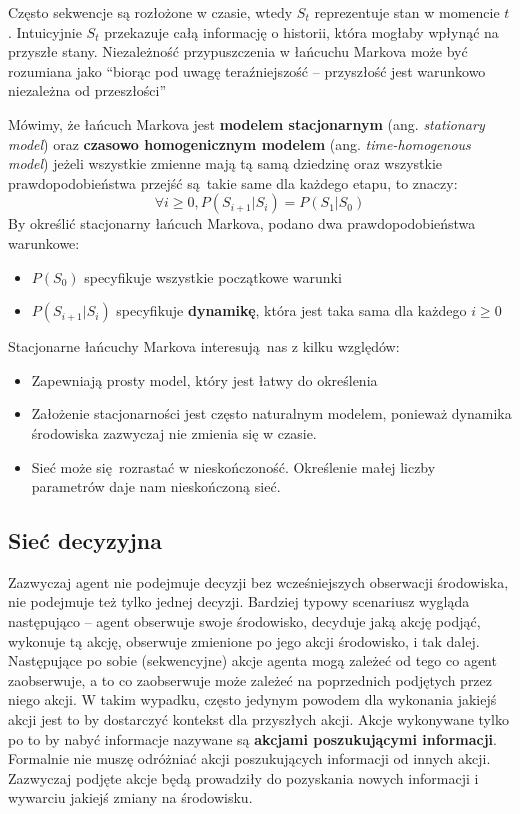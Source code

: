 \documentclass[a4paper, 12pt,oneside]{book}
\begin{document}
Często sekwencje są rozłożone w czasie, wtedy $S_t$ reprezentuje stan w
momencie $t$. Intuicyjnie $S_t$ przekazuje całą informację o historii, która
mogłaby wpłynąć na przyszłe stany. Niezależność przypuszczenia w łańcuchu
Markova może być rozumiana jako ``biorąc pod uwagę teraźniejszość -- przyszłość
jest warunkowo niezależna od przeszłości''

Mówimy, że łańcuch Markova jest \textbf{modelem stacjonarnym} (ang.
\textit{stationary model}) oraz \textbf{czasowo homogenicznym modelem} (ang.
\textit{time-homogenous model}) jeżeli wszystkie zmienne mają tą samą dziedzinę
oraz wszystkie prawdopodobieństwa przejść są takie same dla każdego etapu, to
znaczy:
\[\forall i \ge 0, P(S_{i+1}|S_i) = P(S_1|S_0)\]
By określić stacjonarny łańcuch Markova, podano dwa prawdopodobieństwa
warunkowe:
\begin{itemize}
		\setlength\itemsep{-0.4em}
	\item $P(S_0)$ specyfikuje wszystkie początkowe warunki
	\item $P(S_{i+1} | S_i)$ specyfikuje \textbf{dynamikę}, która jest taka
		sama dla każdego $i \ge 0$
\end{itemize}
Stacjonarne łańcuchy Markova interesują nas z kilku względów:
\begin{itemize}
		\setlength\itemsep{-0.4em}
	\item Zapewniają prosty model, który jest łatwy do określenia
	\item Założenie stacjonarności jest często naturalnym modelem, ponieważ
		dynamika środowiska zazwyczaj nie zmienia się w czasie.
	\item Sieć może się rozrastać w nieskończoność. Określenie małej liczby
		parametrów daje nam nieskończoną
		sieć\cite{ai_foundations_markov_chains}.
\end{itemize}

\subsection{Sieć decyzyjna}
Zazwyczaj agent nie podejmuje decyzji bez wcześniejszych obserwacji środowiska,
nie podejmuje też tylko jednej decyzji. Bardziej typowy scenariusz wygląda
następująco -- agent obserwuje swoje środowisko, decyduje jaką akcję podjąć,
wykonuje tą akcję, obserwuje zmienione po jego akcji środowisko, i tak dalej.
Następujące po sobie (sekwencyjne) akcje agenta mogą zależeć od tego co agent
zaobserwuje, a to co zaobserwuje może zależeć na poprzednich podjętych przez
niego akcji. W takim wypadku, często jedynym powodem dla wykonania jakiejś
akcji jest to by dostarczyć kontekst dla przyszłych akcji. Akcje wykonywane
tylko po to by nabyć informacje nazywane są \textbf{akcjami poszukującymi
informacji}. Formalnie nie muszę odróżniać akcji poszukujących informacji od
innych akcji. Zazwyczaj podjęte akcje będą prowadziły do pozyskania nowych
informacji i wywarciu jakiejś zmiany na środowisku.
\end{document}
